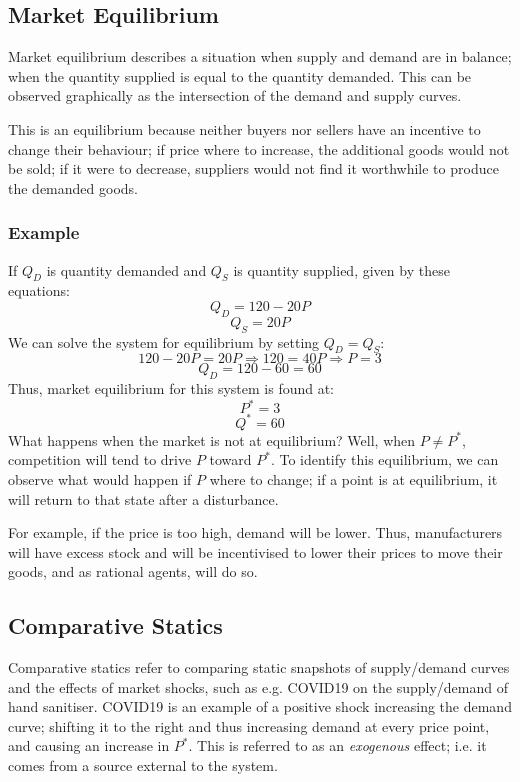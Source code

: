 \documentclass[12pt]{report}
\begin{document}
\begin{flushleft}
\subsection*{Market Equilibrium}
Market equilibrium describes a situation when supply and demand are in balance; when the 
quantity supplied is equal to the quantity demanded. This can be observed graphically as
the intersection of the demand and supply curves. 

\bigskip
This is an equilibrium because neither buyers
nor sellers have an incentive to change their behaviour; if price where to increase, the
additional goods would not be sold; if it were to decrease, suppliers would not find it
worthwhile to produce the demanded goods.

\subsubsection*{Example}
If \(Q_D\) is quantity demanded and \(Q_S\) is quantity supplied, given by these equations:
\[Q_D = 120 - 20P\]
\[Q_S = 20P\]
We can solve the system for equilibrium by setting \(Q_D = Q_S\):
\[120 - 20P = 20P \Rightarrow 120 = 40P \Rightarrow P = 3\]
\[Q_D = 120 - 60 = 60\]
Thus, market equilibrium for this system is found at:
\[P^* = 3\]
\[Q^* = 60\]
What happens when the market is not at equilibrium? Well, when \(P \neq P^*\),
competition will tend to drive \(P\) toward \(P^*\). To identify this equilibrium,
we can observe what would happen if \(P\) where to change; if a point is at equilibrium,
it will return to that state after a disturbance.

\bigskip
For example, if the price is too high, demand will be lower. Thus, manufacturers will
have excess stock and will be incentivised to lower their prices to move their goods,
and as rational agents, will do so.

\subsection*{Comparative Statics}
Comparative statics refer to comparing static snapshots of supply/demand curves
and the effects of market shocks, such as e.g. COVID19 on the supply/demand of hand sanitiser.
COVID19 is an example of a positive shock increasing the demand curve; shifting it to the right and 
thus increasing demand at every price point, and causing an increase in \(P^*\). This is referred to as an \textit{exogenous} effect;
i.e. it comes from a source external to the system.


\end{flushleft}
\end{document}
